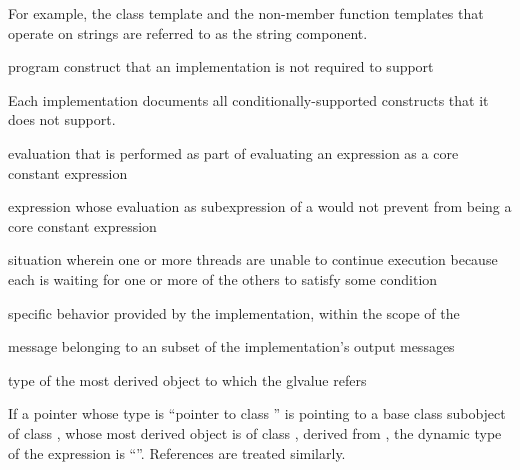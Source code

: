 \begin{defnote}
For example, the class template 
and the non-member function templates
that operate on strings are referred to as the string component.
\end{defnote}

%
program construct that an implementation is not required to support

\begin{defnote}
Each implementation documents all conditionally-supported
constructs that it does not support.
\end{defnote}

%
evaluation that is performed as part of evaluating an expression
as a core constant expression

%
expression whose evaluation as subexpression of a
 would not prevent 
from being a core constant expression

%
situation wherein
one or more threads are unable to continue execution because each is
 waiting for one or more of the others to satisfy some condition

%
specific behavior provided by the implementation,
within the scope of the 

%
message belonging to an  subset of the
implementation's output messages

%
 type of the most derived object to which the
glvalue refers

\begin{example}
If a pointer  whose type is ``pointer to
class '' is pointing to a base class subobject
of class , whose most derived object is of class , derived
from , the dynamic type of the
expression  is ``''. References are
treated similarly.
\end{example}

